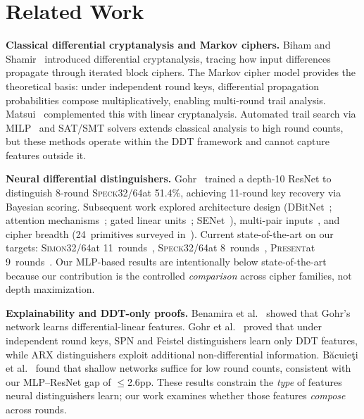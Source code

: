 \documentclass[runningheads]{llncs}
\newcommand{\speck}{\textsc{Speck32/64}}
\newcommand{\simon}{\textsc{Simon32/64}}
\newcommand{\present}{\textsc{Present}}
\newcommand{\pp}{pp}
\begin{document}

\section{Related Work}
\label{sec:related}

\textbf{Classical differential cryptanalysis and Markov ciphers.}
Biham and Shamir~\cite{biham1991differential} introduced differential cryptanalysis, tracing how input differences propagate through iterated block ciphers.
The Markov cipher model provides the theoretical basis: under independent round keys, differential propagation probabilities compose multiplicatively, enabling multi-round trail analysis.
Matsui~\cite{matsui1993linear} complemented this with linear cryptanalysis.
Automated trail search via MILP~\cite{mouha2012milp} and SAT/SMT solvers extends classical analysis to high round counts, but these methods operate within the DDT framework and cannot capture features outside it.

\textbf{Neural differential distinguishers.}
Gohr~\cite{gohr2019} trained a depth-10 ResNet to distinguish 8-round \speck at 51.4\%, achieving 11-round key recovery via Bayesian scoring.
Subsequent work explored architecture design (DBitNet~\cite{bellini2023dbitnet}; attention mechanisms~\cite{lee2024attention}; gated linear units~\cite{jang2023glu}; SENet~\cite{bao2022enhancing}), multi-pair inputs~\cite{zhang2025multipair}, and cipher breadth (24~primitives surveyed in~\cite{gerault2024sok}).
Current state-of-the-art on our targets: \simon at 11~rounds~\cite{bellini2023dbitnet,tian2022simon}, \speck at 8~rounds~\cite{gohr2019}, \present at 9~rounds~\cite{bellini2023dbitnet}.
Our MLP-based results are intentionally below state-of-the-art because our contribution is the controlled \emph{comparison} across cipher families, not depth maximization.

\textbf{Explainability and DDT-only proofs.}
Benamira et al.~\cite{benamira2021deeper} showed that Gohr's network learns differential-linear features.
Gohr et al.~\cite{gohr2022assessment} proved that under independent round keys, SPN and Feistel distinguishers learn only DDT features, while ARX distinguishers exploit additional non-differential information.
B\u{a}cuie\c{t}i et al.~\cite{bacuieti2022depth} found that shallow networks suffice for low round counts, consistent with our MLP--ResNet gap of $\leq$2.6\pp.
These results constrain the \emph{type} of features neural distinguishers learn; our work examines whether those features \emph{compose} across rounds.
\end{document}
